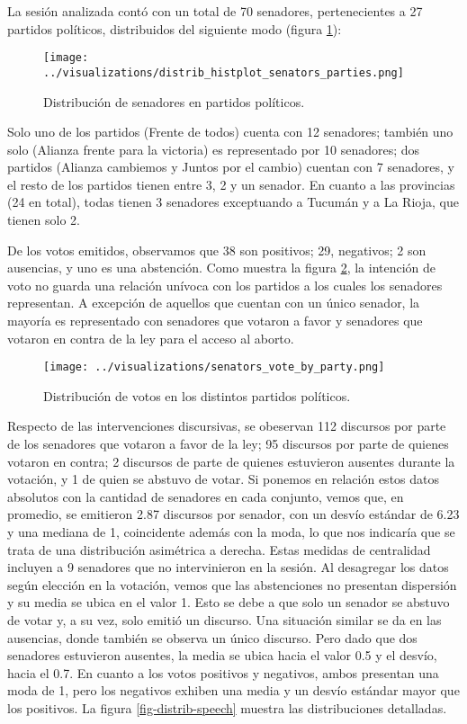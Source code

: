 La sesión analizada contó con un total de 70 senadores,
pertenecientes a 27 partidos políticos, distribuidos del
siguiente modo (figura \ref{fig-distrib-senators}):

\begin{figure}[h!]
\centering
\texttt{[image: ../visualizations/distrib\_histplot\_senators\_parties.png]}
\caption{Distribución de senadores en partidos políticos.}
\label{fig-distrib-senators}
\end{figure}

Solo uno de los partidos (Frente de todos) cuenta con 12
senadores; también uno solo (Alianza frente para la victoria) es
representado por 10 senadores; dos partidos (Alianza cambiemos y
Juntos por el cambio) cuentan con 7 senadores, y el resto de los
partidos tienen entre 3, 2 y un senador.
En cuanto a las provincias (24 en total), todas tienen 3 senadores
exceptuando a Tucumán y a La Rioja, que tienen solo 2.

De los votos emitidos, observamos que 38 son positivos; 29, negativos;
2 son ausencias, y uno es una abstención.
Como muestra la figura \ref{fig-distrib-vote}, la intención
de voto no guarda una relación unívoca con los partidos a los cuales los
senadores representan. A excepción de aquellos que cuentan con un único
senador, la mayoría es representado con senadores que votaron a favor y senadores
que votaron en contra de la ley para el acceso al aborto.

\begin{figure}[h!]
\centering
\texttt{[image: ../visualizations/senators\_vote\_by\_party.png]}
\caption{Distribución de votos en los distintos partidos políticos.}
\label{fig-distrib-vote}
\end{figure}

Respecto de las intervenciones discursivas, se obeservan 112 discursos
por parte de los senadores que votaron a favor de la ley; 95 discursos por parte
de quienes votaron en contra; 2 discursos de parte de quienes estuvieron ausentes
durante la votación, y 1 de quien se abstuvo de votar.
Si ponemos en relación estos datos absolutos con la cantidad de senadores en cada
conjunto, vemos que, en promedio, se emitieron
2.87 discursos por senador, con un desvío estándar de 6.23 y una mediana de 1,
coincidente además
con la moda, lo que nos indicaría que se trata de una distribución asimétrica a derecha.
Estas medidas de centralidad incluyen a 9 senadores que no intervinieron en
la sesión.
Al desagregar los datos según elección en la votación, vemos que las
abstenciones no presentan
dispersión y su media se ubica en el valor 1. Esto se debe a que solo un senador
se abstuvo de votar y, a su vez, solo emitió un discurso.
Una situación similar se da en las ausencias, donde también se observa un único discurso.
Pero dado que dos senadores estuvieron ausentes, la media se ubica hacia el valor 0.5 y
el desvío, hacia el 0.7.
En cuanto a los votos positivos y negativos, ambos presentan una moda de 1,
pero los negativos
exhiben una media y un desvío estándar mayor que los positivos.
La figura \ref{fig-distrib-speech} muestra las distribuciones detalladas.

